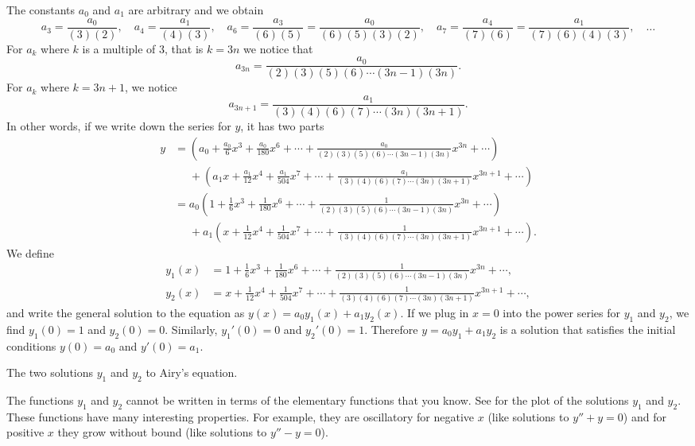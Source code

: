 \begin{example}
The constants $a_0$ and $a_1$ are arbitrary and we obtain
\begin{equation*}
a_3 = \frac{a_0}{(3)(2)}, \quad
a_4 = \frac{a_1}{(4)(3)}, \quad
a_6 = \frac{a_3}{(6)(5)} = \frac{a_0}{(6)(5)(3)(2)}, \quad
a_7 = \frac{a_4}{(7)(6)} = \frac{a_1}{(7)(6)(4)(3)}, \quad \ldots
\end{equation*}
For $a_k$ where $k$ is a multiple of $3$, that is $k=3n$ we notice
that
\begin{equation*}
a_{3n} = \frac{a_0}{(2)(3)(5)(6) \cdots (3n-1)(3n)} .
\end{equation*}
For $a_k$ where $k = 3n+1$, we notice
\begin{equation*}
a_{3n+1} = \frac{a_1}{(3)(4)(6)(7) \cdots (3n)(3n+1)} .
\end{equation*}
In other words, if we write down the series for $y$,
it has two parts
\begin{equation*}
\begin{split}
y &=
\left(
a_0 + \frac{a_0}{6} x^3 + \frac{a_0}{180} x^6 + \cdots +
\frac{a_0}{(2)(3)(5)(6) \cdots (3n-1)(3n)} x^{3n} + \cdots
\right)
\\
&\phantom{=}
+
\left(
a_1 x + \frac{a_1}{12} x^4 + \frac{a_1}{504} x^7 + \cdots +
\frac{a_1}{(3)(4)(6)(7) \cdots (3n)(3n+1)} x^{3n+1} + \cdots
\right)
\\
& =
a_0
\left(
1 + \frac{1}{6} x^3 + \frac{1}{180} x^6 + \cdots +
\frac{1}{(2)(3)(5)(6) \cdots (3n-1)(3n)} x^{3n} + \cdots
\right)
\\
&\phantom{=}
+
a_1
\left(
x + \frac{1}{12} x^4 + \frac{1}{504} x^7 + \cdots +
\frac{1}{(3)(4)(6)(7) \cdots (3n)(3n+1)} x^{3n+1} + \cdots
\right) .
\end{split}
\end{equation*}
We define
\begin{align*}
y_1(x) &= 
1 + \frac{1}{6} x^3 + \frac{1}{180} x^6 + \cdots +
\frac{1}{(2)(3)(5)(6) \cdots (3n-1)(3n)} x^{3n} + \cdots, \\
y_2(x) &= 
x + \frac{1}{12} x^4 + \frac{1}{504} x^7 + \cdots +
\frac{1}{(3)(4)(6)(7) \cdots (3n)(3n+1)} x^{3n+1} + \cdots ,
\end{align*}
and write the general solution to the equation as
$y(x)= a_0 y_1(x) + a_1 y_2(x)$.  If we plug in $x=0$ into the
power series for $y_1$ and $y_2$, we find
$y_1(0) = 1$ and $y_2(0) = 0$.  Similarly,
$y_1'(0) = 0$ and $y_2'(0) = 1$.  Therefore $y = a_0 y_1 + a_1 y_2$
is a solution
that satisfies the initial conditions $y(0) = a_0$ and $y'(0) = a_1$.

\begin{myfig}
\capstart
{}
\caption{The two solutions $y_1$ and $y_2$ to Airy's equation.\label{ps:airyfig}}
\end{myfig}
\end{example}
The functions $y_1$ and $y_2$ cannot be written in terms of the elementary
functions that you know.  See  for the plot of
the solutions $y_1$ and $y_2$.  These functions have many interesting
properties.  For example, they are oscillatory for negative $x$
(like solutions to $y''+y=0$) and
for positive $x$ they grow without bound (like solutions to $y''-y=0$).

